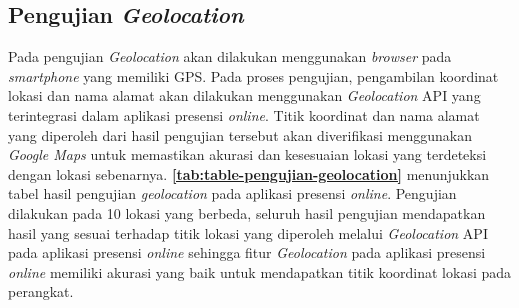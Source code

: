 \subsection{Pengujian \textit{Geolocation}}
Pada pengujian \textit{Geolocation} akan dilakukan menggunakan \textit{browser} pada \textit{smartphone} yang memiliki GPS. Pada proses pengujian, pengambilan koordinat lokasi dan nama alamat akan dilakukan menggunakan \textit{Geolocation} API yang terintegrasi dalam aplikasi presensi \textit{online}. Titik koordinat dan nama alamat yang diperoleh dari hasil pengujian tersebut akan diverifikasi menggunakan \textit{Google Maps} untuk memastikan akurasi dan kesesuaian lokasi yang terdeteksi dengan lokasi sebenarnya. \textbf{\ref{tab:table-pengujian-geolocation}} menunjukkan tabel hasil pengujian \textit{geolocation} pada aplikasi presensi \textit{online}. Pengujian dilakukan pada 10 lokasi yang berbeda, seluruh hasil pengujian mendapatkan hasil yang sesuai terhadap titik lokasi yang diperoleh melalui \textit{Geolocation} API pada aplikasi presensi \textit{online} sehingga fitur \textit{Geolocation} pada aplikasi presensi \textit{online} memiliki akurasi yang baik untuk mendapatkan titik koordinat lokasi pada perangkat.

